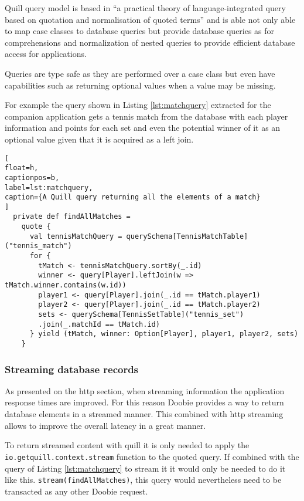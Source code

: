 \documentclass[../main.tex]{subfiles}
\begin{document}
Quill query model is based in ``a  practical  theory  of  language-integrated
query  based  on quotation and normalisation of quoted terms'' \autocite{CheneyAQuery} and
is able not only able to map case classes to database queries but provide
database queries as for comprehensions and normalization of nested queries to
provide efficient database access for applications.

Queries are type safe as they are performed over a case class but even have
capabilities such as returning optional values when a value may be missing.

For example the query shown in Listing \ref{lst:matchquery} extracted for the companion application gets a tennis
match from the database with each player information and points for each set and
even the potential winner of it as an optional value given that it is acquired
as a left join.

\begin{lstlisting}[
float=h,
captionpos=b,
label=lst:matchquery,
caption={A Quill query returning all the elements of a match}
]
  private def findAllMatches =
    quote {
      val tennisMatchQuery = querySchema[TennisMatchTable]("tennis_match")
      for {
        tMatch <- tennisMatchQuery.sortBy(_.id)
        winner <- query[Player].leftJoin(w => tMatch.winner.contains(w.id))
        player1 <- query[Player].join(_.id == tMatch.player1)
        player2 <- query[Player].join(_.id == tMatch.player2)
        sets <- querySchema[TennisSetTable]("tennis_set")
        .join(_.matchId == tMatch.id)
      } yield (tMatch, winner: Option[Player], player1, player2, sets)
    }
\end{lstlisting}

\subsubsection{Streaming database records}
As presented on the http section, when streaming information the application
response times are improved. For this reason Doobie provides a way to return
database elements in a streamed manner. This combined with http streaming allows
to improve the overall latency in a great manner.

To return streamed content with quill it is only needed to apply the
\texttt{io.getquill.context.stream} function to the quoted query. If combined
with the query of Listing \ref{lst:matchquery} to stream it it would only be
needed to do it like this. \texttt{stream(findAllMatches)}, this query would
nevertheless need to be transacted as any other Doobie request.
\end{document}
